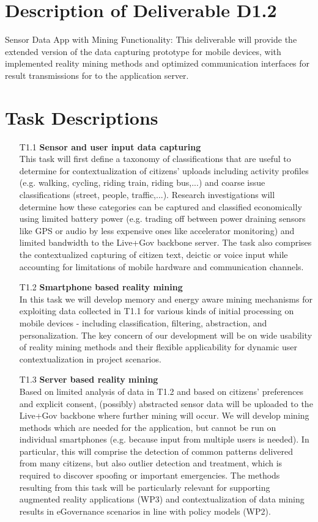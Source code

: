 \documentclass[external]{20120615_deliverable_template_ukob}
\theoremstyle{definition}
\begin{document}
\section{Description of Deliverable D1.2}
Sensor Data App with Mining Functionality: This deliverable will provide the
extended version of the data capturing prototype for mobile devices, with
implemented reality mining methods and optimized communication interfaces for
result transmissions for to the application server.

\section{Task Descriptions}
\begin{itemize}
\item[T1.1] {\bf Sensor and user input data capturing} \\
  This task will first define a taxonomy of classifications that are useful to
  determine for contextualization of citizens’ uploads including activity
  profiles (e.g. walking, cycling, riding train, riding bus,...) and coarse
  issue classifications (street, people, traffic,...). Research investigations
  will determine how these categories can be captured and classified
  economically using limited battery power (e.g. trading off between power
  draining sensors like GPS or audio by less expensive ones like accelerator
  monitoring) and limited bandwidth to the Live+Gov backbone server. The task
  also comprises the contextualized capturing of citizen text, deictic or voice
  input while accounting for limitations of mobile hardware and communication
  channels.
\item[T1.2] {\bf Smartphone based reality mining} \\
  In this task we will develop memory and energy aware mining mechanisms for
  exploiting data collected in T1.1 for various kinds of initial processing on
  mobile devices - including classification, filtering, abstraction, and
  personalization. The key concern of our development will be on wide usability
  of reality mining methods and their flexible applicability for dynamic user
  contextualization in project scenarios.
\item[T1.3] {\bf Server based reality mining} \\
  Based on limited analysis of data in T1.2 and based on citizens’ preferences
  and explicit consent, (possibly) abstracted sensor data will be uploaded to
  the Live+Gov backbone where further mining will occur. We will develop mining
  methods which are needed for the application, but cannot be run on individual
  smartphones (e.g.  because input from multiple users is needed). In
  particular, this will comprise the detection of common patterns delivered from
  many citizens, but also outlier detection and treatment, which is required to
  discover spoofing or important emergencies. The methods resulting from this
  task will be particularly relevant for supporting augmented reality
  applications (WP3) and contextualization of data mining results in eGovernance
  scenarios in line with policy models (WP2).
\end{itemize}
\end{document}
